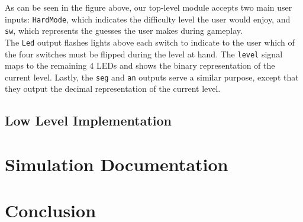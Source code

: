 \documentclass[]{article}
\begin{document}
As can be seen in the figure above, our top-level module accepts two main user inputs: \texttt{HardMode}, which indicates the difficulty level the user would enjoy, and \texttt{sw}, which represents the guesses the user makes during gameplay.\\

The \texttt{Led} output flashes lights above each switch to indicate to the user which of the four switches must be flipped during the level at hand. The \texttt{level} signal maps to the remaining 4 LEDs and shows the binary representation of the current level. Lastly, the \texttt{seg} and \texttt{an} outputs serve a similar purpose, except that they output the decimal representation of the current level.

\subsection{Low Level Implementation}


\section{Simulation Documentation}


\section{Conclusion}
\end{document}
